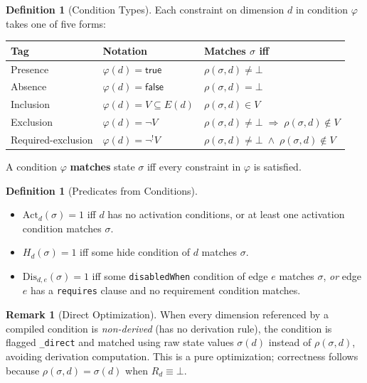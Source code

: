 \documentclass[11pt]{article}
\theoremstyle{definition}
\newtheorem{definition}[theorem]{Definition}
\newtheorem{remark}[theorem]{Remark}
\newcommand{\Edg}[1]{E(#1)}            %
\newcommand{\sel}{\sigma}              %
\newcommand{\res}[2]{\rho(#1,#2)}      %
\newcommand{\Act}{\mathrm{Act}}        %
\newcommand{\Dis}{\mathrm{Dis}}        %
\begin{document}
\begin{definition}[Condition Types]\label{def:condtypes}
Each constraint on dimension $d$ in condition $\varphi$ takes one of five
forms:
\begin{center}
\begin{tabular}{lll}
\textbf{Tag} & \textbf{Notation} & \textbf{Matches $\sel$ iff} \\
\hline
Presence  & $\varphi(d) = \mathsf{true}$   & $\res{\sel}{d} \neq \bot$ \\
Absence   & $\varphi(d) = \mathsf{false}$  & $\res{\sel}{d} = \bot$ \\
Inclusion & $\varphi(d) = V \subseteq \Edg{d}$ & $\res{\sel}{d} \in V$ \\
Exclusion & $\varphi(d) = \neg V$            & $\res{\sel}{d} \neq \bot \;\Rightarrow\; \res{\sel}{d} \notin V$ \\
Required-exclusion & $\varphi(d) = \neg^! V$ & $\res{\sel}{d} \neq \bot \;\wedge\; \res{\sel}{d} \notin V$ \\
\end{tabular}
\end{center}
A condition $\varphi$ \textbf{matches} state $\sel$ iff every constraint
in $\varphi$ is satisfied.
\end{definition}

\begin{definition}[Predicates from Conditions]\label{def:pred}
\begin{itemize}
  \item $\Act_d(\sel) = 1$ iff $d$ has no activation conditions, or at
        least one activation condition matches $\sel$.
  \item $H_d(\sel) = 1$ iff some hide condition of $d$ matches $\sel$.
  \item $\Dis_{d,e}(\sel) = 1$ iff some \texttt{disabledWhen} condition
        of edge $e$ matches $\sel$, \emph{or} edge $e$ has a
        \texttt{requires} clause and no requirement condition matches.
\end{itemize}
\end{definition}

\begin{remark}[Direct Optimization]\label{rem:direct}
When every dimension referenced by a compiled condition is
\emph{non-derived} (has no derivation rule), the condition is flagged
\texttt{\_direct} and matched using raw state values $\sel(d)$
instead of $\res{\sel}{d}$, avoiding derivation computation. This is a
pure optimization; correctness follows because
$\res{\sel}{d} = \sel(d)$ when $R_d \equiv \bot$.
\end{remark}
\end{document}
